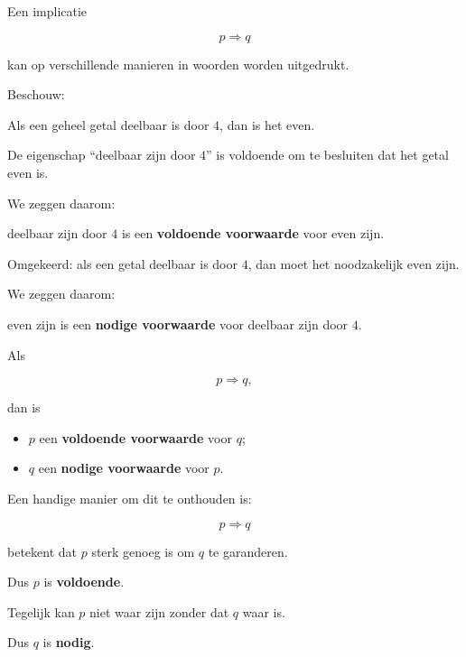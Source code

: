 \documentclass{ximera}
\begin{document}

Een implicatie

\[
p\Rightarrow q
\]

kan op verschillende manieren in woorden worden uitgedrukt.

Beschouw:

\begin{center}
Als een geheel getal deelbaar is door $4$, dan is het even.
\end{center}

De eigenschap ``deelbaar zijn door $4$'' is voldoende om te besluiten
dat het getal even is.

We zeggen daarom:

\begin{center}
deelbaar zijn door $4$ is een \textbf{voldoende voorwaarde}
voor even zijn.
\end{center}

Omgekeerd: als een getal deelbaar is door $4$, dan moet het noodzakelijk
even zijn.

We zeggen daarom:

\begin{center}
even zijn is een \textbf{nodige voorwaarde}
voor deelbaar zijn door $4$.
\end{center}


\begin{definitie}

Als

\[
p\Rightarrow q,
\]

dan is

\begin{itemize}

  \item $p$ een \textbf{voldoende voorwaarde} voor $q$;

  \item $q$ een \textbf{nodige voorwaarde} voor $p$.

\end{itemize}

\end{definitie}


\begin{opmerking}

Een handige manier om dit te onthouden is:

\[
\boxed{
p\Rightarrow q
}
\]

betekent dat $p$ sterk genoeg is om $q$ te garanderen.

Dus $p$ is \textbf{voldoende}.

Tegelijk kan $p$ niet waar zijn zonder dat $q$ waar is.

Dus $q$ is \textbf{nodig}.

\end{opmerking}
\end{document}
